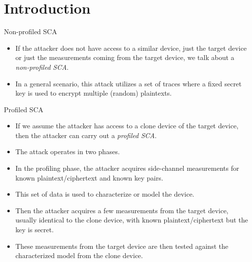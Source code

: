 \section{Introduction}
\begin{frame}{\VideoName}
    \tableofcontents[currentsection]
\end{frame}

\begin{frame}{Non-profiled SCA}
    \begin{itemize}
        \item If the attacker does not have access to a similar device, just the target device or just the measurements coming from the target device, we talk about a \textit{non-profiled SCA}.
        \item In a general scenario, this attack utilizes a set of traces where a fixed secret key is used to encrypt multiple (random) plaintexts.
    \end{itemize}
\end{frame}

\begin{frame}{Profiled SCA}
    \begin{itemize}
        \item If we assume the attacker has access to a clone device of the target device, then the attacker can carry out a \textit{profiled SCA}.
       \item The attack operates in two phases.
        \item In the profiling phase, the attacker acquires side-channel measurements for known plaintext/ciphertext and known key pairs.
       \item This set of data is used to characterize or model the device.
        \item Then the attacker acquires a few measurements from the target device, usually identical to the clone device, with known plaintext/ciphertext but the key is secret.
        \item These measurements from the target device are then tested against the characterized model from the clone device.
    \end{itemize}
\end{frame}

